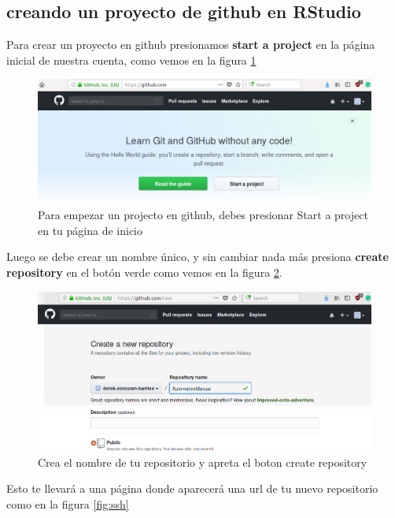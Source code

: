 \documentclass[]{book}
\begin{document}
\hypertarget{creando-un-proyecto-de-github-en-rstudio}{%
\subsection{creando un proyecto de github en
RStudio}\label{creando-un-proyecto-de-github-en-rstudio}}

Para crear un proyecto en github presionamos \textbf{start a project} en
la página inicial de nuestra cuenta, como vemos en la figura
\ref{fig:Start}

\begin{figure}

{\centering \includegraphics[width=0.8\linewidth]{StartAProject} 

}

\caption{Para empezar un projecto en github, debes presionar Start a project en tu página de inicio}\label{fig:Start}
\end{figure}

Luego se debe crear un nombre único, y sin cambiar nada más presiona
\textbf{create repository} en el botón verde como vemos en la figura
\ref{fig:Name}.

\begin{figure}

{\centering \includegraphics[width=0.8\linewidth]{NombreRepo} 

}

\caption{Crea el nombre de tu repositorio y apreta el boton create repository}\label{fig:Name}
\end{figure}

Esto te llevará a una página donde aparecerá una url de tu nuevo
repositorio como en la figura \ref{fig:ssh}
\end{document}
